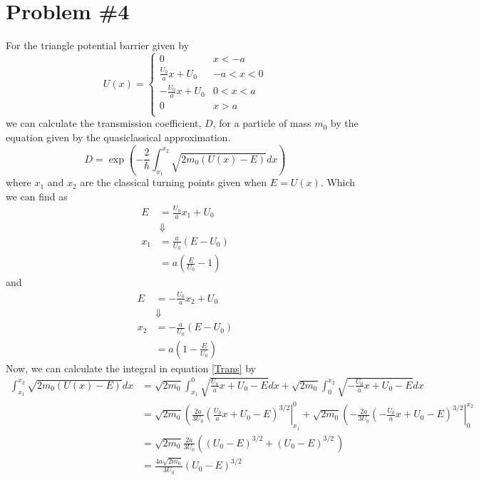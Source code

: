 \documentclass[11pt]{article}
\numberwithin{equation}{section}
\begin{document}
\section{Problem \#4}
For the triangle potential barrier given by
$$U(x) = \left\{\begin{array}{ll}
               0                    &x<-a\\
               \frac{U_0}{a}x+U_0   &-a<x<0\\
               -\frac{U_0}{a}x+U_0  &0<x<a\\
               0                    &x>a\\
         \end{array}\right.$$
we can calculate the transmission coefficient, $D$, for a particle of mass $m_0$ by the 
equation given by the quasiclassical approximation.
\begin{equation}
D = \exp\left(-\frac{2}{\hbar}\int_{x_1}^{x_2}\sqrt{2m_0(U(x)-E)}dx\right)
\label{Trans}
\end{equation}
where $x_1$ and $x_2$ are the classical turning points given when $E=U(x)$. Which we can
find as
\begin{align*}
E &= \frac{U_0}{a}x_1+U_0\\
&\Downarrow\\
x_1 &= \frac{a}{U_0}(E-U_0)\\
&= a\left(\frac{E}{U_0}-1\right)
\end{align*}
and
\begin{align*}
E &= -\frac{U_0}{a}x_2+U_0\\
&\Downarrow\\
x_2 &= -\frac{a}{U_0}(E-U_0)\\
&= a\left(1-\frac{E}{U_0}\right)
\end{align*}
Now, we can calculate the integral in equation \ref{Trans} by
\begin{align*}
\int_{x_1}^{x_2}\sqrt{2m_0(U(x)-E)}dx &= \sqrt{2m_0}\int_{x_1}^{0}\sqrt{\frac{U_0}{a}x+U_0-E}dx + \sqrt{2m_0}\int_{0}^{x_2}\sqrt{-\frac{U_0}{a}x+U_0-E}dx\\
&= \sqrt{2m_0}\left(\frac{2a}{3U_0}\left(\frac{U_0}{a}x+U_0-E\right)^{3/2}\right|_{x_1}^{0} + \sqrt{2m_0}\left(-\frac{2a}{3U_0}\left(-\frac{U_0}{a}x+U_0-E\right)^{3/2}\right|_{0}^{x_2}\\
&= \sqrt{2m_0}\frac{2a}{3U_0}\left((U_0-E)^{3/2} + (U_0-E)^{3/2}\frac{}{}\right)\\
&= \frac{4a\sqrt{2m_0}}{3U_0}(U_0-E)^{3/2}
\end{align*}
\end{document}

